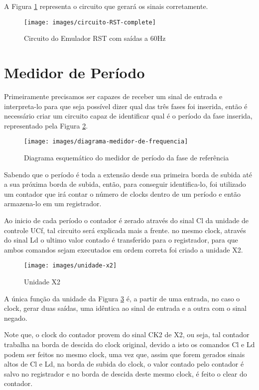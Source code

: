 \documentclass[12pt,a4paper,openany]{abntex2}
\begin{document}
A Figura \ref{fig:circuito-RST-complete} representa o circuito que gerará os sinais corretamente.

\begin{figure}[!htp]
	\centering
	\caption{Circuito do Emulador RST com saídas a 60Hz}
	\texttt{[image: images/circuito-RST-complete]}
	\label{fig:circuito-RST-complete}
\end{figure}

\section{Medidor de Período}

Primeiramente precisamos ser capazes de receber um sinal de entrada e interpreta-lo para que seja possível dizer qual das três fases foi inserida, então é necessário criar um circuito capaz de identificar qual é o período da fase inserida, representado pela Figura \ref{fig:diagrama-medidor-de-frequencia}.

\begin{figure}[!htp]
	\centering
	\caption{Diagrama esquemático do medidor de período da fase de referência}
	\texttt{[image: images/diagrama-medidor-de-frequencia]}
	\label{fig:diagrama-medidor-de-frequencia}
\end{figure}

Sabendo que o período é toda a extensão desde sua primeira
borda de subida até a sua próxima borda de subida, então, para conseguir identifica-lo, foi utilizado um contador que irá contar o número de clocks dentro de um período e então armazena-lo em um registrador.

Ao inicio de cada período o contador é zerado através do sinal Cl da unidade de controle UCf, tal circuito será explicada mais a frente. no mesmo clock, através do sinal Ld o ultimo valor contado é transferido para o registrador, para que ambos comandos sejam executados em ordem correta foi criado a unidade X2.

\begin{figure}[!htp]
	\centering
	\caption{Unidade X2}
	\texttt{[image: images/unidade-x2]}
	\label{fig:unidade-x2}
\end{figure}

A única função da unidade da Figura \ref{fig:unidade-x2} é, a partir de uma entrada, no caso o clock, gerar duas saídas, uma idêntica ao sinal de entrada e a outra com o sinal negado.

Note que, o clock do contador provem do sinal CK2 de X2, ou seja, tal contador trabalha na borda de descida do clock original, devido a isto os comandos Cl e Ld podem ser feitos no mesmo clock, uma vez que, assim que forem gerados sinais altos de Cl e Ld, na borda de subida do clock, o valor contado pelo contador é salvo no registrador e no borda de descida deste mesmo clock, é feito o clear do contador.
\end{document}
